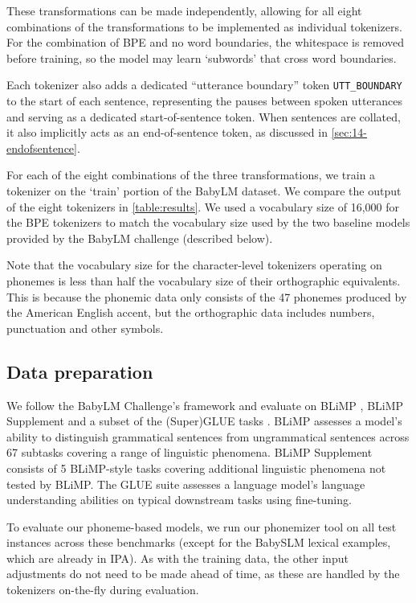 These transformations can be made independently, allowing for all eight combinations of the transformations to be implemented as individual tokenizers. For the combination of BPE and no word boundaries, the whitespace is removed before training, so the model may learn `subwords' that cross word boundaries.

Each tokenizer also adds a dedicated ``utterance boundary'' token \texttt{UTT\_BOUNDARY} to the start of each sentence, representing the pauses between spoken utterances and serving as a dedicated start-of-sentence token. When sentences are collated, it also implicitly acts as an end-of-sentence token, as discussed in \cref{sec:14-endofsentence}.

For each of the eight combinations of the three transformations, we train a tokenizer on the `train' portion of the BabyLM dataset.
We compare the output of the eight tokenizers in \cref{table:results}. We used a vocabulary size of 16,000 for the BPE tokenizers to match the vocabulary size used by the two baseline models provided by the BabyLM challenge (described below). 

Note that the vocabulary size for the character-level tokenizers operating on phonemes is less than half the vocabulary size of their orthographic equivalents. This is because the phonemic data only consists of the 47 phonemes produced by the American English accent, but the orthographic data includes numbers, punctuation and other symbols. 

\subsection{Data preparation}\label{sec:14-datapreparation}

We follow the BabyLM Challenge's framework and evaluate on BLiMP \citep{warstadt-etal-2020-blimp-benchmark}, BLiMP Supplement \citep{choshen-et-al-2024-callforpapers-babylm2} and a subset of the (Super)GLUE tasks \citep{wang-etal-2018-glue, wang-etal-2019-superglue}. BLiMP assesses a model's ability to distinguish grammatical sentences from ungrammatical sentences across 67 subtasks covering a range of linguistic phenomena. BLiMP Supplement consists of 5 BLiMP-style tasks covering additional linguistic phenomena not tested by BLiMP. The GLUE suite assesses a language model's language understanding abilities on typical downstream tasks using fine-tuning. 

To evaluate our phoneme-based models, we run our phonemizer tool on all test instances across these benchmarks (except for the BabySLM lexical examples, which are already in IPA). As with the training data, the other input adjustments do not need to be made ahead of time, as these are handled by the tokenizers on-the-fly during evaluation.

